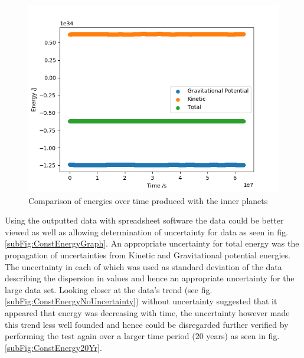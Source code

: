 \documentclass{article}
\begin{document}
                \begin{figure}[!ht]
                    \centering    
                    \includegraphics[width = 0.5\linewidth]{Figures/ConstEnergy/ConstEnergyPROGOUT.png}
                    \caption{Comparison of energies over time produced with the inner planets}
                    \label{fig:constEnergyProgOut}
                \end{figure}
                \pagebreak
                Using the outputted data with spreadsheet software the data could be better viewed 
                as well as allowing determination of uncertainty for data as seen in 
                fig.\ref{subFig:ConstEnergyGraph}. An appropriate uncertainty for 
                total energy was the propagation of uncertainties from Kinetic and Gravitational 
                potential energies. The uncertainty in each of which was used as standard
                deviation of the data describing the dispersion in values and hence an 
                appropriate uncertainty for the large data set. Looking closer at the data's
                trend (see fig.\ref{subFig:ConstEnergyNoUncertainty}) without uncertainty suggested 
                that it appeared that energy was decreasing with time, the uncertainty however made 
                this trend less well founded and hence could be disregarded further verified by 
                performing the test again over a larger time period
                (20 years) as seen in fig.\ref{subFig:ConstEnergy20Yr}.
\end{document}
